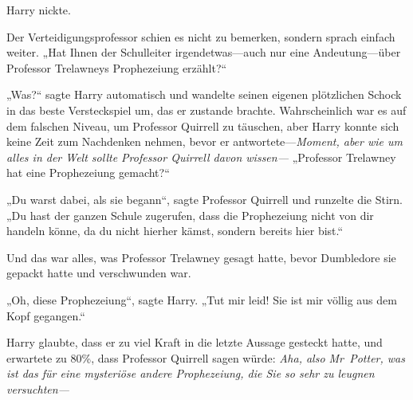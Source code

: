 Harry nickte.

Der Verteidigungsprofessor schien es nicht zu bemerken, sondern sprach einfach weiter. „Hat Ihnen der Schulleiter irgendetwas—auch nur eine Andeutung—über Professor Trelawneys Prophezeiung erzählt?“

„Was?“ sagte Harry automatisch und wandelte seinen eigenen plötzlichen Schock in das beste Versteckspiel um, das er zustande brachte.
Wahrscheinlich war es auf dem falschen Niveau, um Professor Quirrell zu täuschen, aber Harry konnte sich keine Zeit zum Nachdenken nehmen, bevor er antwortete—\emph{Moment, aber wie um alles in der Welt sollte Professor Quirrell davon wissen—} „Professor Trelawney hat eine Prophezeiung gemacht?“

„Du warst dabei, als sie begann“, sagte Professor Quirrell und runzelte die Stirn. „Du hast der ganzen Schule zugerufen, dass die Prophezeiung nicht von dir handeln könne, da du nicht hierher kämst, sondern bereits hier bist.“


Und das war alles, was Professor Trelawney gesagt hatte, bevor Dumbledore sie gepackt hatte und verschwunden war.

„Oh, diese Prophezeiung“, sagte Harry. „Tut mir leid! Sie ist mir völlig aus dem Kopf gegangen.“

Harry glaubte, dass er zu viel Kraft in die letzte Aussage gesteckt hatte, und erwartete zu 80\%, dass Professor Quirrell sagen würde: \emph{Aha, also Mr~Potter, was ist das für eine mysteriöse \emph{andere} Prophezeiung, die Sie so sehr zu leugnen versuchten—}

